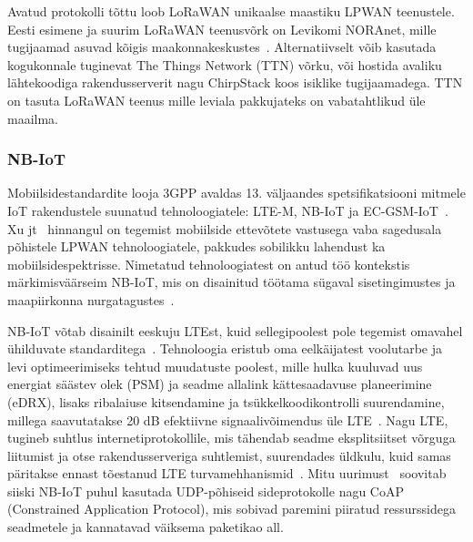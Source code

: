 \documentclass[12pt]{article}
\begin{document}
Avatud protokolli tõttu loob LoRaWAN unikaalse maastiku LPWAN teenustele.
Eesti esimene ja suurim LoRaWAN teenusvõrk on Levikomi NORAnet, mille tugijaamad asuvad kõigis maakonnakeskustes~\cite{noranetuudis}.
Alternatiivselt võib kasutada kogukonnale tuginevat The Things Network (TTN) võrku, või hostida avaliku lähtekoodiga rakendusserverit nagu ChirpStack koos isiklike tugijaamadega.
TTN on tasuta LoRaWAN teenus mille leviala pakkujateks on vabatahtlikud üle maailma.

\subsubsection{NB-IoT}

Mobiilsidestandardite looja 3GPP avaldas 13. väljaandes spetsifikatsiooni mitmele IoT rakendustele suunatud tehnoloogiatele: LTE-M, NB-IoT ja EC-GSM-IoT~\cite{3gppiot}.
Xu jt~\cite{xuyao} hinnangul on tegemist mobiilside ettevõtete vastusega vaba sagedusala põhistele  LPWAN tehnoloogiatele, pakkudes sobilikku lahendust ka mobiilsidespektrisse.
Nimetatud tehnoloogiatest on antud töö kontekstis märkimisväärseim NB-IoT, mis on disainitud töötama sügaval sisetingimustes ja maapiirkonna nurgatagustes~\cite{martinez}.

NB-IoT võtab disainilt eeskuju LTEst, kuid sellegipoolest pole tegemist omavahel ühilduvate standarditega~\cite{wanglin}.
Tehnoloogia eristub oma eelkäijatest voolutarbe ja levi optimeerimiseks tehtud muudatuste poolest, mille hulka kuuluvad uus energiat säästev olek (PSM) ja seadme allalink kättesaadavuse planeerimine (eDRX), lisaks ribalaiuse kitsendamine ja tsükkelkoodikontrolli suurendamine, millega saavutatakse 20 dB efektiivne signaalivõimendus üle LTE~\cite{xuyao}.
Nagu LTE, tugineb suhtlus internetiprotokollile, mis tähendab seadme eksplitsiitset võrguga liitumist ja otse rakendusserveriga suhtlemist, suurendades üldkulu, kuid samas päritakse ennast tõestanud LTE turvamehhanismid~\cite{basu}.
Mitu uurimust~\cite{wirges, larmo} soovitab siiski NB-IoT puhul kasutada UDP-põhiseid sideprotokolle nagu CoAP (Constrained Application Protocol), mis sobivad paremini piiratud ressurssidega seadmetele ja kannatavad väiksema paketikao all.
\end{document}
